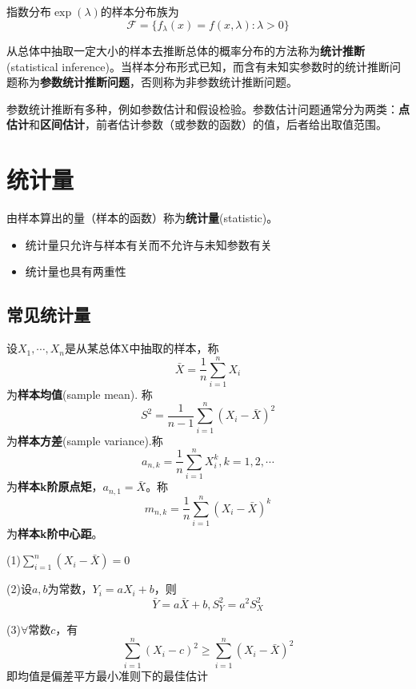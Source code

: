 \documentclass{ctexbook}
\begin{document}
\begin{example}
    指数分布$\exp(\lambda)$的样本分布族为
    $$\mathcal{F} =\{f_{\lambda}(x)=f(x,\lambda):\lambda>0\}$$
\end{example}

\begin{definition}
    从总体中抽取一定大小的样本去推断总体的概率分布的方法称为\textbf{统计推断}(statistical inference)。当样本分布形式已知，而含有未知实参数时的统计推断问题称为\textbf{参数统计推断问题}，否则称为非参数统计推断问题。
\end{definition}

参数统计推断有多种，例如参数估计和假设检验。参数估计问题通常分为两类：\textbf{点估计}和\textbf{区间估计}，前者估计参数（或参数的函数）的值，后者给出取值范围。

\section{统计量}

\begin{definition}
    由样本算出的量（样本的函数）称为\textbf{统计量}(statistic)。
\end{definition}

\begin{remark}
    \begin{itemize}
        \item 统计量只允许与样本有关而不允许与未知参数有关
        \item 统计量也具有两重性
    \end{itemize}
\end{remark}

\subsection{常见统计量}

\begin{definition}
    设$X_1,\cdots,X_n$是从某总体X中抽取的样本，称
    $$\bar{X}=\frac{1}{n}\sum_{i=1}^n X_i$$
    为\textbf{样本均值}(sample mean). 称
    $$S^2=\frac{1}{n-1}\sum_{i=1}^n (X_i-\bar{X})^2$$
    为\textbf{样本方差}(sample variance).称
    $$a_{n,k}=\frac{1}{n}\sum_{i=1}^n X_i^k,k=1,2,\cdots$$
    为\textbf{样本k阶原点矩}，$a_{n,1}=\bar{X}$。称
    $$m_{n,k}=\frac{1}{n}\sum_{i=1}^n (X_i-\bar{X})^k$$
    为\textbf{样本k阶中心距}。
\end{definition}

\begin{proposition}
    (1)$\sum_{i=1}^n (X_i-\bar{X})=0$

    (2)设$a,b$为常数，$Y_i=aX_i+b$，则
    $$\bar{Y}=a\bar{X}+b,S_Y^2=a^2 S_X^2$$

    (3)$\forall \text{常数}c$，有
    $$\sum_{i=1}^n(X_i-c)^2\ge\sum_{i=1}^n (X_i-\bar{X})^2$$
    即均值是偏差平方最小准则下的最佳估计
\end{proposition}
\end{document}

